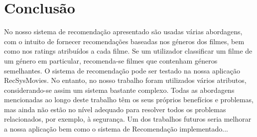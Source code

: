 \section{Conclusão}

No nosso sistema de recomendação apresentado são usadas várias abordagens, com o intuito de fornecer recomendações baseadas nos géneros dos filmes, bem como nos ratings atribuídos a cada filme. Se um utilizador classificar um filme de um género em particular, recomenda-se filmes que contenham géneros semelhantes. 
O sistema de recomendação pode ser testado na nossa aplicação RecSysMovies. No entanto, no nosso trabalho foram utilizados vários atributos, considerando-se assim um sistema bastante complexo. 
Todas as abordagens mencionadas ao longo deste trabalho têm os seus próprios benefícios e problemas, mas ainda não estão no nível adequado para resolver todos os problemas relacionados, por exemplo, à segurança. Um dos trabalhos futuros seria melhorar a nossa aplicação bem como o sistema de Recomendação implementado...

